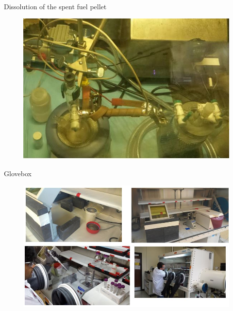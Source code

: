 \documentclass{beamer}
\begin{document}
\begin{frame}{Dissolution of the spent fuel pellet}
      \begin{figure}[H]
        \vspace*{-1cm}
        \begin{center}
	   \includegraphics[scale = 0.65]{dissolution}
	\end{center}
      \end{figure}
\end{frame}

\begin{frame}{Glovebox}
      \begin{figure}[H]
        \vspace*{-1cm}
        \begin{center}
	   \includegraphics[scale = 0.5]{glovebox}
	\end{center}
      \end{figure}
\end{frame}
\end{document}
